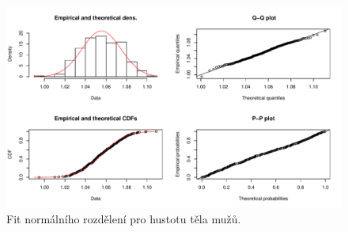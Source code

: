 \documentclass[11pt,american,czech]{article}
\begin{document}
\begin{figure}[ht!]
	\centering
	\includegraphics[width=1.0\linewidth]{Images/FIGURES/density_fitdist}
	\caption{Fit normálního rozdělení pro hustotu těla mužů.}
	\label{fig:density_fitdist}
\end{figure}

\newpage

%
%
%
%
\end{document}
